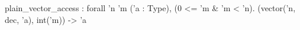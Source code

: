 plain_vector_access : forall 'n 'm ('a : Type), (0 <= 'm & 'm < 'n). (vector('n, dec, 'a), int('m)) -> 'a